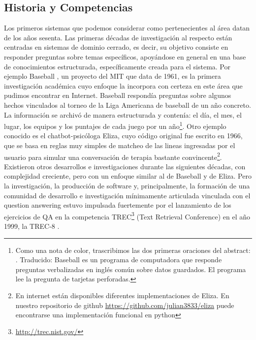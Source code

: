\subsection{Historia y Competencias}
\label{subsec:historia}
\label{subsec:competencias}
Los primeros sistemas que podemos considerar como pertenecientes al área datan de los años sesenta. Las primeras décadas de investigación al respecto están centradas en sistemas de dominio cerrado, es decir, su objetivo consiste en responder preguntas sobre temas específicos, apoyándose en general en una base de conocimientos estructurada, específicamente creada para el sistema. Por ejemplo Baseball \cite{BASEBALL}, un proyecto del MIT que data de 1961, es la primera investigación académica cuyo enfoque la incorpora con certeza en este área que pudimos encontrar en Internet. Baseball respondía preguntas sobre algunos hechos vinculados al torneo de la Liga Americana de baseball de un año concreto. La información se archivó de manera estructurada y contenía: el día, el mes, el lugar, los equipos y los puntajes de cada juego por un año\footnote{Como una nota de color, trascribimos las dos primeras oraciones del abstract: . Traducido: Baseball es un programa de computadora que responde preguntas verbalizadas en inglés común sobre datos guardados. El programa lee la pregunta de tarjetas perforadas.}. Otro ejemplo conocido es el chatbot-psicóloga Eliza, cuyo código original fue escrito en 1966, que se basa en reglas muy simples de matcheo de las lineas ingresadas por el usuario para simular una conversación de terapia bastante convincente\footnote{En internet están disponibles diferentes implementaciones de Eliza. En nuestro repositorio de github \url{https://github.com/julian3833/eliza} puede encontrarse una implementación funcional en python}. Existieron otros desarrollos e investigaciones durante las siguientes décadas, con complejidad creciente, pero con un enfoque similar al de Baseball y de Eliza. Pero la investigación, la producción de software y, principalmente, la formación de una comunidad de desarrollo e investigación mínimamente articulada vinculada con el question answering estuvo impulsada fuertemente por el lanzamiento de los ejercicios de QA en la competencia TREC\footnote{\url{http://trec.nist.gov/}} (Text Retrieval Conference) en el año 1999, la TREC-8 \cite{TREC8}.

